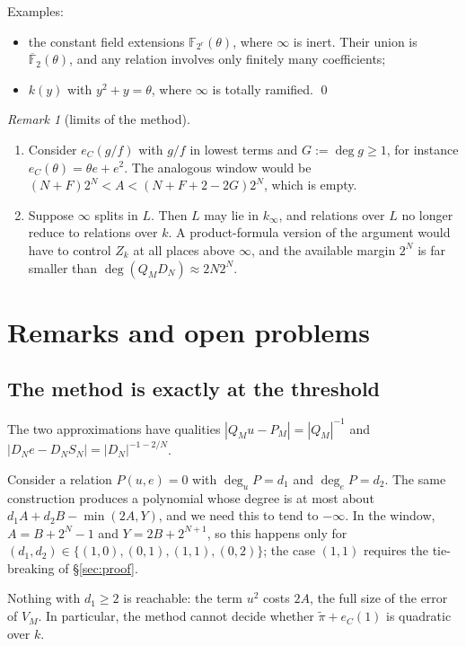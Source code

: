 \documentclass[11pt]{amsart}
\theoremstyle{remark}
\newtheorem{remark}[theorem]{Remark}
\numberwithin{equation}{section}
\newcommand{\F}{\mathbb{F}}
\newcommand{\kinf}{k_\infty}
\newcommand{\pit}{\tilde\pi}
\newcommand{\eC}{e_C}
\begin{document}
Examples:
\begin{itemize}
\item the constant field extensions $\F_{2^r}(\theta)$, where $\infty$ is inert. Their union is $\overline{\F}_2(\theta)$, and any relation involves only finitely many coefficients;
\item $k(y)$ with $y^2+y=\theta$, where $\infty$ is totally ramified. \qed
\end{itemize}

\begin{remark}[limits of the method]\label{rem:limits}
\begin{enumerate}
\item[(1)] Consider $\eC(g/f)$ with $g/f$ in lowest terms and $G:=\deg g\ge1$, for instance $\eC(\theta)=\theta e+e^2$. The analogous window would be $(N+F)2^N<A<(N+F+2-2G)2^N$, which is empty.
\item[(2)] Suppose $\infty$ splits in $L$. Then $L$ may lie in $\kinf$, and relations over $L$ no longer reduce to relations over $k$. A product-formula version of the argument would have to control $Z_k$ at all places above $\infty$, and the available margin $2^N$ is far smaller than $\deg(Q_MD_N)\approx2N2^N$.
\end{enumerate}
\end{remark}

\section{Remarks and open problems}\label{sec:remarks}

\subsection{The method is exactly at the threshold}\label{subsec:threshold}
The two approximations have qualities $|Q_Mu-P_M|=|Q_M|^{-1}$ and $|D_Ne-D_NS_N|=|D_N|^{-1-2/N}$.

Consider a relation $P(u,e)=0$ with $\deg_uP=d_1$ and $\deg_eP=d_2$. The same construction produces a polynomial whose degree is at most about $d_1A+d_2B-\min(2A,Y)$, and we need this to tend to $-\infty$. In the window, $A=B+2^N-1$ and $Y=2B+2^{N+1}$, so this happens only for $(d_1,d_2)\in\{(1,0),(0,1),(1,1),(0,2)\}$; the case $(1,1)$ requires the tie-breaking of \S\ref{sec:proof}.

Nothing with $d_1\ge2$ is reachable: the term $u^2$ costs $2A$, the full size of the error of $V_M$. In particular, the method cannot decide whether $\pit+\eC(1)$ is quadratic over $k$.
\end{document}
